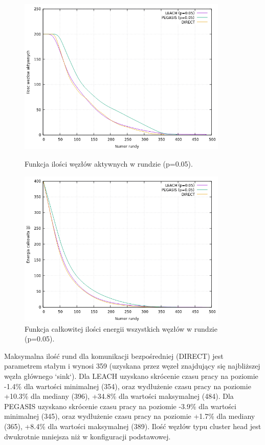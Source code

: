 \documentclass[a4paper,12pt,twoside,openany]{report}
\begin{document}
\begin{figure}[H]
 \centering
 \includegraphics[width=10cm]{images/gnuplot/test_4/nodes_in_round_p005.png}
 \caption{Funkcja ilości węzłów aktywnych w rundzie (p=0.05).}
 \includegraphics[width=10cm]{images/gnuplot/test_4/energy_in_round_p005.png}
 \caption{Funkcja całkowitej ilości energii wszystkich węzłów w rundzie (p=0.05).}
\end{figure}

\par
Maksymalna ilość rund dla komunikacji bezpośredniej (DIRECT) jest parametrem stałym i wynosi 359 (uzyskana przez węzeł znajdujący się najbliższej węzła głównego `sink`).
Dla LEACH uzyskano skrócenie czasu pracy na poziomie -1.4\% dla wartości minimalnej (354), oraz wydłużenie czasu pracy na poziomie +10.3\% dla mediany (396), +34.8\% dla wartości maksymalnej (484).
Dla PEGASIS uzyskano skrócenie czasu pracy na poziomie -3.9\% dla wartości minimalnej (345), oraz wydłużenie czasu pracy na poziomie +1.7\% dla mediany (365), +8.4\% dla wartości maksymalnej (389).
Ilość węzłów typu cluster head jest dwukrotnie mniejsza niż w konfiguracji podstawowej.
\end{document}
